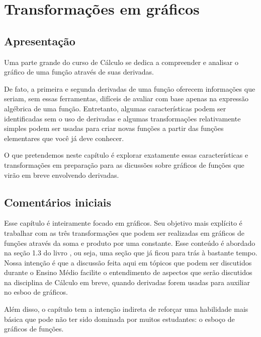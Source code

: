 \documentclass[main.tex]{subfiles}
\begin{document}
\paraAmbos

\chapter{Transformações em gráficos}

\paraAlunos

\section{Apresentação}

Uma parte grande do curso de Cálculo se dedica a compreender e analisar o gráfico de uma função através de suas derivadas.

De fato, a primeira e segunda derivadas de uma função oferecem informações que seriam, sem essas ferramentas, difíceis de avaliar com base apenas na expressão algébrica de uma função. Entretanto, algumas características podem ser identificadas sem o uso de derivadas e algumas transformações relativamente simples podem ser usadas para criar novas funções a partir das funções elementares que você já deve conhecer.

O que pretendemos neste capítulo é explorar exatamente essas características e transformações em preparação para as dicussões sobre gráficos de funções que virão em breve envolvendo derivadas.

\paraTutores

\section{Comentários iniciais}

Esse capítulo é inteiramente focado em gráficos. Seu objetivo mais explícito é trabalhar com as três transformações que podem ser realizadas em gráficos de funções através da soma e produto por uma constante. Esse conteúdo é abordado na seção 1.3 do livro , ou seja, uma seção que já ficou para trás à bastante tempo. Nossa intenção é que a discussão feita aqui em tópicos que podem ser discutidos durante o Ensino Médio facilite o entendimento de aspectos que serão discutidos na disciplina de Cálculo em breve, quando derivadas forem usadas para auxiliar no esboo de gráficos.

Além disso, o capítulo tem a intenção indireta de reforçar uma habilidade mais básica que pode não ter sido dominada por muitos estudantes: o esboço de gráficos de funções.
\end{document}
